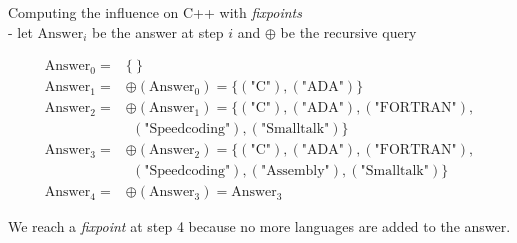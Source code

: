 \documentclass[xcolor={usenames,dvipsnames}]{beamer}
\begin{document}
\begin{frame}[fragile]

Computing the influence on C++ with \emph{fixpoints}\\
- let $\text{Answer}_i$ be the answer at step $i$ and $\oplus$ be the recursive query

\vspace*{-1em}
\begin{center}
\small
\begin{align*}
\text{Answer}_0 =& \{\ \}\\
\text{Answer}_1 =& \oplus(\text{Answer}_0) = \{(\text{"C"}), (\text{"ADA"})\} \\
\text{Answer}_2 =& \oplus(\text{Answer}_1) = \{(\text{"C"}), (\text{"ADA"}), (\text{"FORTRAN"}), \\
&\ \ (\text{"Speedcoding"}), (\text{"Smalltalk"})\} \\
\text{Answer}_3 =& \oplus(\text{Answer}_2) = \{(\text{"C"}), (\text{"ADA"}), (\text{"FORTRAN"}), \\
& \ \ (\text{"Speedcoding"}), (\text{"Assembly"}), (\text{"Smalltalk"})\}\\
\text{Answer}_4 =& \oplus(\text{Answer}_3) = \text{Answer}_3
\end{align*}
\end{center}

We reach a \emph{fixpoint} at step 4 because no more languages are added to the answer.

\end{frame}


%
%
\end{document}
